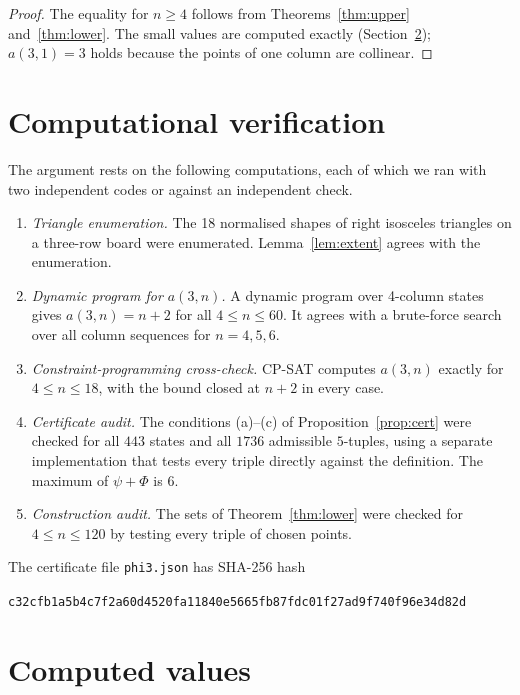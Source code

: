 \documentclass[11pt]{article}
\theoremstyle{definition}
\theoremstyle{remark}
\begin{document}
\begin{proof}
The equality for $n\ge 4$ follows from Theorems~\ref{thm:upper} and~\ref{thm:lower}. The small values are computed exactly (Section~\ref{sec:computed}); $a(3,1)=3$ holds because the points of one column are collinear.
\end{proof}

\section{Computational verification}\label{sec:verif}

The argument rests on the following computations, each of which we ran with two independent codes or against an independent check.

\begin{enumerate}[label=(\arabic*)]
\item \emph{Triangle enumeration.} The 18 normalised shapes of right isosceles triangles on a three-row board were enumerated. Lemma~\ref{lem:extent} agrees with the enumeration.
\item \emph{Dynamic program for $a(3,n)$.} A dynamic program over 4-column states gives $a(3,n)=n+2$ for all $4\le n\le 60$. It agrees with a brute-force search over all column sequences for $n=4,5,6$.
\item \emph{Constraint-programming cross-check.} CP-SAT computes $a(3,n)$ exactly for $4\le n\le 18$, with the bound closed at $n+2$ in every case.
\item \emph{Certificate audit.} The conditions (a)--(c) of Proposition~\ref{prop:cert} were checked for all $443$ states and all $1736$ admissible $5$-tuples, using a separate implementation that tests every triple directly against the definition. The maximum of $\psi+\Phi$ is $6$.
\item \emph{Construction audit.} The sets of Theorem~\ref{thm:lower} were checked for $4\le n\le 120$ by testing every triple of chosen points.
\end{enumerate}

The certificate file \texttt{phi3.json} has SHA-256 hash
\begin{center}\small\texttt{c32cfb1a5b4c7f2a60d4520fa11840e5665fb87fdc01f27ad9f740f96e34d82d}\end{center}

\section{Computed values}\label{sec:computed}
\end{document}
